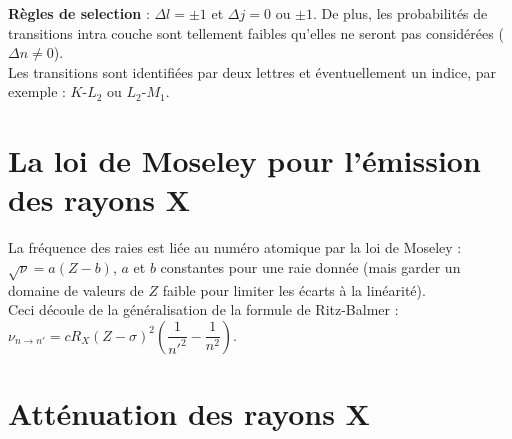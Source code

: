 \documentclass[13pt, twoside, a4paper, french, tikz]{report}
\begin{document}
      \textbf{Règles de selection} : $\Delta l = \pm 1$ et $\Delta j = 0$ ou $\pm 1$.
      De plus, les probabilités de transitions intra couche sont tellement faibles qu'elles ne seront pas considérées ($\Delta n \neq 0$).\\
      
      Les transitions sont identifiées par deux lettres et éventuellement un indice, par exemple : $K$-$L_2$ ou $L_2$-$M_1$.
  
  
  \section{La loi de Moseley pour l'émission des rayons X}\label{sec:la-loi-de-moseley-pour-l'emission-des-rayons-x}
    
    La fréquence des raies est liée au numéro atomique par la loi de Moseley : $\sqrt{\nu} = a(Z-b)$, $a$ et $b$ constantes pour une raie donnée (mais garder un domaine de valeurs de $Z$ faible pour limiter les écarts à la linéarité).\\
    Ceci découle de la généralisation de la formule de Ritz-Balmer : $\nu_{n\rightarrow n'} = c R_X (Z - \sigma)^2\left(\dfrac{1}{n'^2} - \dfrac{1}{n^2}\right)$.
  
  
  \section{Atténuation des rayons X}\label{sec:attenuation-des-rayons-x}
    
\end{document}
